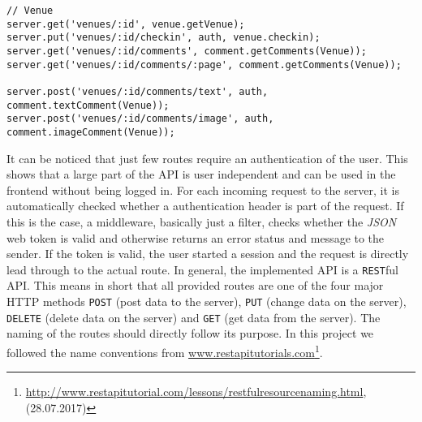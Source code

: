 \begin{lstlisting}[caption={All venue realted \texttt{REST} routes defining parts of the API of the server.}, label=lst:routes]
// Venue
server.get('venues/:id', venue.getVenue);
server.put('venues/:id/checkin', auth, venue.checkin);
server.get('venues/:id/comments', comment.getComments(Venue));
server.get('venues/:id/comments/:page', comment.getComments(Venue));

server.post('venues/:id/comments/text', auth, comment.textComment(Venue));
server.post('venues/:id/comments/image', auth, comment.imageComment(Venue));
\end{lstlisting}

It can be noticed that just few routes require an authentication of the user. This shows that a large part of the API is user independent and can be used in the frontend without being logged in. For each incoming request to the server, it is automatically checked whether a authentication header is part of the request. If this is the case, a middleware, basically just a filter, checks whether the \textit{JSON} web token is valid and otherwise returns an error status and message to the sender. If the token is valid, the user started a session and the request is directly lead through to the actual route.
\newline\newline
In general, the implemented API is a \texttt{REST}ful API. This means in short that all provided routes are one of the four major HTTP methods \texttt{POST} (post data to the server), \texttt{PUT} (change data on the server), \texttt{DELETE} (delete data on the server) and \texttt{GET} (get data from the server). The naming of the routes should directly follow its purpose. In this project we followed the name conventions from \url{www.restapitutorials.com}\footnote{\url{http://www.restapitutorial.com/lessons/restfulresourcenaming.html}, (28.07.2017)}.

